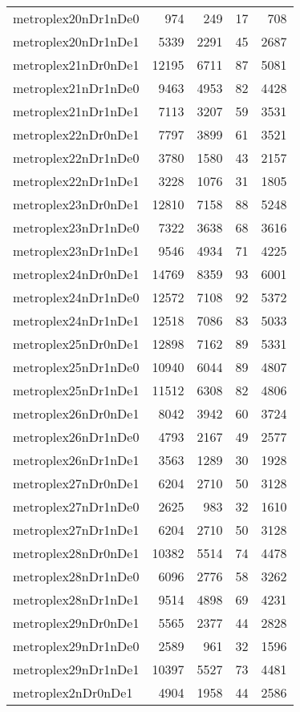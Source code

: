 \begin{longtable}{lrrrr}
metroplex20nDr1nDe0 & 974 & 249 & 17 & 708 \\
metroplex20nDr1nDe1 & 5339 & 2291 & 45 & 2687 \\
metroplex21nDr0nDe1 & 12195 & 6711 & 87 & 5081 \\
metroplex21nDr1nDe0 & 9463 & 4953 & 82 & 4428 \\
metroplex21nDr1nDe1 & 7113 & 3207 & 59 & 3531 \\
metroplex22nDr0nDe1 & 7797 & 3899 & 61 & 3521 \\
metroplex22nDr1nDe0 & 3780 & 1580 & 43 & 2157 \\
metroplex22nDr1nDe1 & 3228 & 1076 & 31 & 1805 \\
metroplex23nDr0nDe1 & 12810 & 7158 & 88 & 5248 \\
metroplex23nDr1nDe0 & 7322 & 3638 & 68 & 3616 \\
metroplex23nDr1nDe1 & 9546 & 4934 & 71 & 4225 \\
metroplex24nDr0nDe1 & 14769 & 8359 & 93 & 6001 \\
metroplex24nDr1nDe0 & 12572 & 7108 & 92 & 5372 \\
metroplex24nDr1nDe1 & 12518 & 7086 & 83 & 5033 \\
metroplex25nDr0nDe1 & 12898 & 7162 & 89 & 5331 \\
metroplex25nDr1nDe0 & 10940 & 6044 & 89 & 4807 \\
metroplex25nDr1nDe1 & 11512 & 6308 & 82 & 4806 \\
metroplex26nDr0nDe1 & 8042 & 3942 & 60 & 3724 \\
metroplex26nDr1nDe0 & 4793 & 2167 & 49 & 2577 \\
metroplex26nDr1nDe1 & 3563 & 1289 & 30 & 1928 \\
metroplex27nDr0nDe1 & 6204 & 2710 & 50 & 3128 \\
metroplex27nDr1nDe0 & 2625 & 983 & 32 & 1610 \\
metroplex27nDr1nDe1 & 6204 & 2710 & 50 & 3128 \\
metroplex28nDr0nDe1 & 10382 & 5514 & 74 & 4478 \\
metroplex28nDr1nDe0 & 6096 & 2776 & 58 & 3262 \\
metroplex28nDr1nDe1 & 9514 & 4898 & 69 & 4231 \\
metroplex29nDr0nDe1 & 5565 & 2377 & 44 & 2828 \\
metroplex29nDr1nDe0 & 2589 & 961 & 32 & 1596 \\
metroplex29nDr1nDe1 & 10397 & 5527 & 73 & 4481 \\
metroplex2nDr0nDe1 & 4904 & 1958 & 44 & 2586 \\

\end{longtable}
